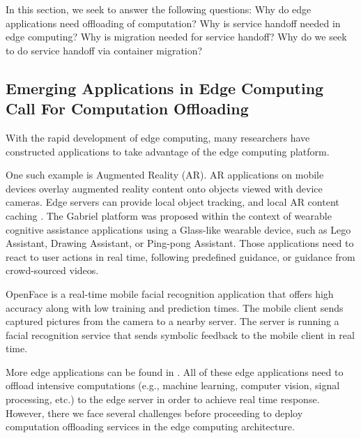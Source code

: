 In this section, we seek to answer the following questions: Why do edge applications need offloading of computation? Why is service handoff needed in edge computing? Why is migration needed for service handoff? Why do we seek to do service handoff via container migration?

\subsection{Emerging Applications in Edge Computing Call For Computation Offloading}

With the rapid development of edge computing, many researchers have constructed applications to take advantage of the edge computing platform. 

One such example is Augmented Reality (AR). AR applications on mobile devices overlay augmented reality content
onto objects viewed with device cameras. Edge servers can
provide local object tracking, and local AR content caching
\cite{satya2009case,MEC2014initiative,MEC2015-5G,hao2017challenges}.
%
The Gabriel platform \cite{ha2014wearable}  was proposed within the context of wearable cognitive assistance applications using a Glass-like wearable device, such as Lego Assistant, Drawing Assistant, or Ping-pong Assistant. 
Those applications need to react to user actions in real time, following predefined guidance, or guidance from crowd-sourced videos. 
%
%


OpenFace\cite{openface2016} is a real-time mobile facial recognition application that offers high accuracy along with low training and prediction times.  The mobile client sends captured pictures from the camera to a nearby server. The server is running a facial recognition service that sends symbolic feedback to the mobile client in real time.  


More edge applications can be found in \cite{yi2015fog,yi2015survey,satya2017edge}.
%
All of these edge applications need to offload intensive computations (e.g., machine learning, computer vision, signal processing, etc.) to the edge server in order to achieve real time response. However, there we face several challenges before proceeding to deploy computation offloading services in the edge computing architecture. 

